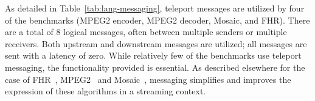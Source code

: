 



\myitem {\teleportmessaging} 
\label{sec:messaging}

As detailed in Table~\ref{tab:lang-messaging}, teleport messages are
utilized by four of the benchmarks (MPEG2 encoder, MPEG2 decoder,
Mosaic, and FHR).  There are a total of 8 logical messages, often
between multiple senders or multiple receivers.  Both upstream and
downstream messages are utilized; all messages are sent with a latency
of zero.  While relatively few of the benchmarks use teleport
messaging, the functionality provided is essential.  As described
elsewhere for the case of FHR~\cite{thies-ppopp05},
MPEG2~\cite{drake-thesis} and Mosaic~\cite{aziz-thesis}, messaging
simplifies and improves the expression of these algorithms in a
streaming context.
